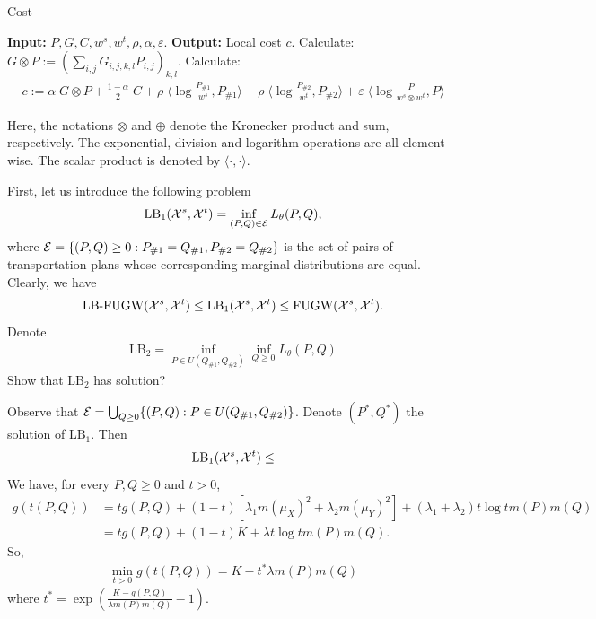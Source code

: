 \begin{algorithm}[t]
  \caption{Cost}
  \label{alg:local_cost}
  \begin{algorithmic}[1]
      \STATE \textbf{Input:} $P, G, C, w^s, w^t, \rho, \alpha, \varepsilon$.
      \STATE \textbf{Output:} Local cost $c$.
      \STATE Calculate: $G \otimes P := \left( \sum_{i,j} G_{i,j,k,l} P_{i,j} \right)_{k,l}$.
      \STATE Calculate:
      \begin{align}
          c := \alpha \; G \otimes P + \frac{1 - \alpha}{2} \; C +
          \rho \; \langle \log \frac{P_{\#1}}{w^s}, P_{\#1} \rangle +
          \rho \; \langle \log \frac{P_{\#2}}{w^t}, P_{\#2} \rangle +
          \varepsilon \; \langle \log \frac{P}{w^s \otimes w^t}, P \rangle
      \end{align}
  \end{algorithmic}
\end{algorithm}
Here, the notations $\otimes$ and $\oplus$ denote the Kronecker product and sum, respectively. The exponential, division and logarithm operations are all element-wise. The scalar product is denoted by $\langle \cdot, \cdot \rangle$.

First, let us introduce the following problem
\begin{equation}
  \text{LB}_1(\mathcal X^s, \mathcal X^t) = \inf_{(P, Q) \in \mathcal E} L_{\theta}(P, Q),
\end{equation}
where $\mathcal E = \{(P, Q) \geq 0: P_{\#1} = Q_{\#1}, P_{\#2} = Q_{\#2} \}$ is
the set of pairs of transportation plans whose corresponding marginal distributions are equal.
Clearly, we have
\begin{equation}
    \text{LB-FUGW} (\mathcal X^s, \mathcal X^t) \leq \text{LB}_1(\mathcal X^s, \mathcal X^t)
    \leq \text{FUGW}(\mathcal X^s, \mathcal X^t).
\end{equation}
Denote
\begin{align}
  \text{LB}_2 = \inf_{P \in U(Q_{\# 1}, Q_{\# 2})} \inf_{Q \geq 0} L_{\theta}(P, Q)
\end{align}
Show that $\text{LB}_2$ has solution?

Observe that $\mathcal E = \bigcup_{Q \geq 0} \{(P, Q): P \in U(Q_{\# 1}, Q_{\# 2}) \}$.
Denote $(P^*, Q^*)$ the solution of $\text{LB}_1$. Then
\begin{align}
  \text{LB}_1(\mathcal X^s, \mathcal X^t) \leq
\end{align}
We have, for every $P, Q \geq 0$ and $t > 0$,
\begin{align}
  g(t(P, Q)) &= t g(P, Q) + (1-t) \left[ \lambda_1 m(\mu_X)^2 + \lambda_2 m(\mu_Y)^2 \right]
  + (\lambda_1 + \lambda_2) t \log t m(P) m(Q) \\
  &= t g(P, Q) + (1 - t) K + \lambda t \log t m(P) m(Q).
\end{align}
So,
\begin{align}
  \min_{t > 0} g(t(P, Q)) = K - t^* \lambda m(P) m(Q)
\end{align}
where $t^* = \exp \left( \frac{K - g(P, Q)}{\lambda m(P) m(Q)} - 1 \right)$.

